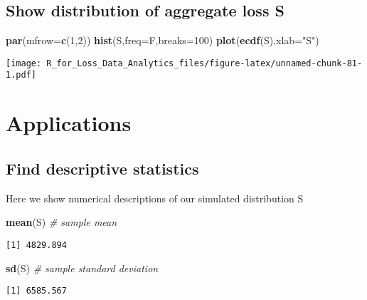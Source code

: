 \documentclass[]{book}
\newenvironment{Shaded}{\begin{snugshade}}{\end{snugshade}}
\newcommand{\KeywordTok}[1]{\textcolor[rgb]{0.13,0.29,0.53}{\textbf{#1}}}
\newcommand{\DataTypeTok}[1]{\textcolor[rgb]{0.13,0.29,0.53}{#1}}
\newcommand{\DecValTok}[1]{\textcolor[rgb]{0.00,0.00,0.81}{#1}}
\newcommand{\StringTok}[1]{\textcolor[rgb]{0.31,0.60,0.02}{#1}}
\newcommand{\CommentTok}[1]{\textcolor[rgb]{0.56,0.35,0.01}{\textit{#1}}}
\newcommand{\NormalTok}[1]{#1}
\theoremstyle{definition}
\theoremstyle{definition}
\theoremstyle{definition}
\theoremstyle{remark}
\begin{document}
\subsection{Show distribution of aggregate loss
S}\label{show-distribution-of-aggregate-loss-s}

\begin{Shaded}
\begin{Highlighting}[]
\KeywordTok{par}\NormalTok{(}\DataTypeTok{mfrow=}\KeywordTok{c}\NormalTok{(}\DecValTok{1}\NormalTok{,}\DecValTok{2}\NormalTok{))}
\KeywordTok{hist}\NormalTok{(S,}\DataTypeTok{freq=}\NormalTok{F,}\DataTypeTok{breaks=}\DecValTok{100}\NormalTok{)}
\KeywordTok{plot}\NormalTok{(}\KeywordTok{ecdf}\NormalTok{(S),}\DataTypeTok{xlab=}\StringTok{"S"}\NormalTok{)}
\end{Highlighting}
\end{Shaded}

\texttt{[image: R\_for\_Loss\_Data\_Analytics\_files/figure-latex/unnamed-chunk-81-1.pdf]}

\section{Applications}\label{applications}

\subsection{Find descriptive
statistics}\label{find-descriptive-statistics}

Here we show numerical descriptions of our simulated distribution S

\begin{Shaded}
\begin{Highlighting}[]
\KeywordTok{mean}\NormalTok{(S)                             }\CommentTok{# sample mean}
\end{Highlighting}
\end{Shaded}

\begin{verbatim}
[1] 4829.894
\end{verbatim}

\begin{Shaded}
\begin{Highlighting}[]
\KeywordTok{sd}\NormalTok{(S)                               }\CommentTok{# sample standard deviation}
\end{Highlighting}
\end{Shaded}

\begin{verbatim}
[1] 6585.567
\end{verbatim}
\end{document}
